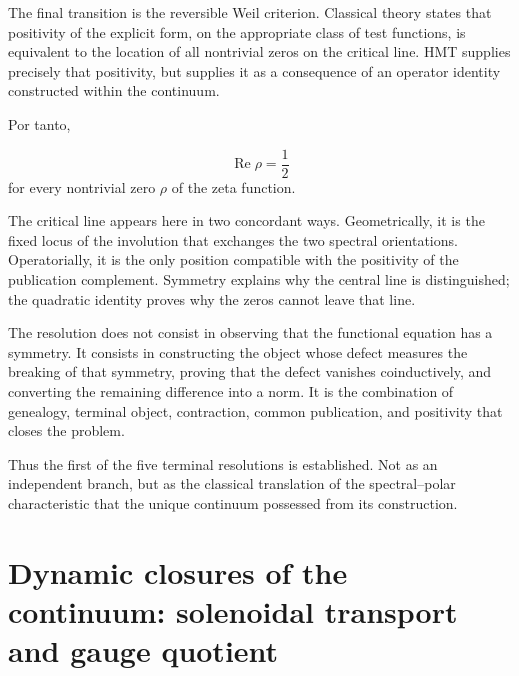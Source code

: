 The final transition is the reversible Weil criterion. Classical theory states that positivity of the explicit form, on the appropriate class of test functions, is equivalent to the location of all nontrivial zeros on the critical line. HMT supplies precisely that positivity, but supplies it as a consequence of an operator identity constructed within the continuum.\par
{}
Por tanto,\par
\[
\operatorname{Re}\rho=\frac12
\]
for every nontrivial zero \(\rho\) of the zeta function.\par
The critical line appears here in two concordant ways. Geometrically, it is the fixed locus of the involution that exchanges the two spectral orientations. Operatorially, it is the only position compatible with the positivity of the publication complement. Symmetry explains why the central line is distinguished; the quadratic identity proves why the zeros cannot leave that line.\par
The resolution does not consist in observing that the functional equation has a symmetry. It consists in constructing the object whose defect measures the breaking of that symmetry, proving that the defect vanishes coinductively, and converting the remaining difference into a norm. It is the combination of genealogy, terminal object, contraction, common publication, and positivity that closes the problem.\par
Thus the first of the five terminal resolutions is established. Not as an independent branch, but as the classical translation of the spectral–polar characteristic that the unique continuum possessed from its construction.\par

\section{Dynamic closures of the continuum: solenoidal transport and gauge quotient}
